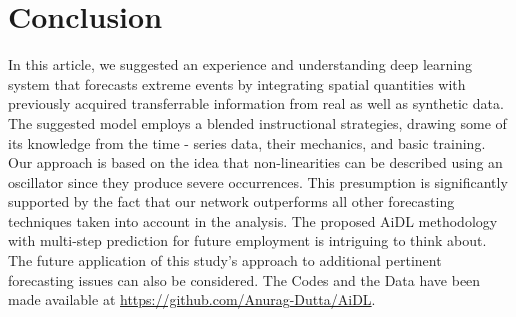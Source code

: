 \documentclass[conference]{IEEEtran}
\begin{document}
\section{Conclusion}\label{sec5}
In this article, we suggested an experience and understanding deep learning system that forecasts extreme events by integrating spatial quantities with previously acquired transferrable information from real as well as synthetic data.
The suggested model employs a blended instructional strategies, drawing some of its knowledge from the time - series data, their mechanics, and basic training. Our approach is based on the idea that non-linearities can be described using an oscillator since they produce severe occurrences. This presumption is significantly supported by the fact that our network outperforms all other forecasting techniques taken into account in the analysis. The proposed AiDL methodology with multi-step prediction for future employment is intriguing to think about. The future application of this study's approach to additional pertinent forecasting issues can also be considered. The Codes and the Data have been made available at \href{https://github.com/Anurag-Dutta/AiDL}{https://github.com/Anurag-Dutta/AiDL}. 
\end{document}
